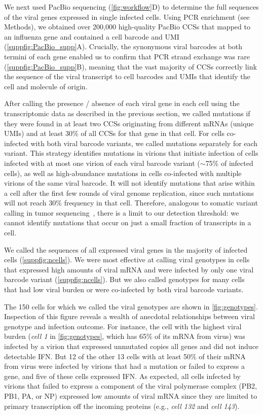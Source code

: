 \documentclass[10pt,letterpaper]{article}
\newcommand{\FIG}[1]{\autoref{fig:#1}}
\newcommand{\SUPPFIG}[1]{\autoref{suppfig:#1}}
\begin{document}
We next used PacBio sequencing (\FIG{workflow}D) to determine the full sequences of the viral genes expressed in single infected cells.
Using PCR enrichment (see Methods), we obtained over 200,000 high-quality PacBio CCSs that mapped to an influenza gene and contained a cell barcode and UMI (\SUPPFIG{PacBio_supp}A).
Crucially, the synonymous viral barcodes at both termini of each gene enabled us to confirm that PCR strand exchange was rare (\SUPPFIG{PacBio_supp}B), meaning that the vast majority of CCSs correctly link the sequence of the viral transcript to cell barcodes and UMIs that identify the cell and molecule of origin.

After calling the presence / absence of each viral gene in each cell using the transcriptomic data as described in the previous section, we called mutations if they were found in at least two CCSs originating from different mRNAs (unique UMIs) and at least 30\% of all CCSs for that gene in that cell.
For cells co-infected with both viral barcode variants, we called mutations separately for each variant.
This strategy identifies mutations in virions that initiate infection of cells infected with at most one virion of each viral barcode variant ($\sim$75\% of infected cells), as well as high-abundance mutations in cells co-infected with multiple virions of the same viral barcode.
It will not identify mutations that arise within a cell after the first few rounds of viral genome replication, since such mutations will not reach 30\% frequency in that cell.
Therefore, analogous to somatic variant calling in tumor sequencing~\citep{xu2014comparison, cibulskis2013sensitive}, there is a limit to our detection threshold: we cannot identify mutations that occur on just a small fraction of transcripts in a cell. 

We called the sequences of all expressed viral genes in the majority of infected cells (\SUPPFIG{ncells}).
We were most effective at calling viral genotypes in cells that expressed high amounts of viral mRNA and were infected by only one viral barcode variant (\SUPPFIG{ncells}).
But we also called genotypes for many cells that had low viral burden or were co-infected by both viral barcode variants.

The 150 cells for which we called the viral genotypes are shown in \FIG{genotypes}.
Inspection of this figure reveals a wealth of anecdotal relationships between viral genotype and infection outcome.
For instance, the cell with the highest viral burden (\textit{cell 1} in \FIG{genotypes}, which has 65\% of its mRNA from virus) was infected by a virion that expressed unmutated copies all genes and did not induce detectable IFN.
But 12 of the other 13 cells with at least 50\% of their mRNA from virus were infected by virions that had a mutation or failed to express a gene, and five of these cells expressed IFN.
As expected, all cells infected by virions that failed to express a component of the viral polymerase complex (PB2, PB1, PA, or NP) expressed low amounts of viral mRNA since they are limited to primary transcription off the incoming proteins (e.g., \textit{cell 132} and \textit{cell 143}).
\end{document}
